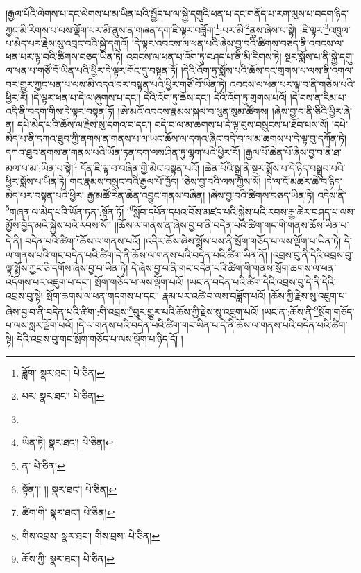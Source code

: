 །རྒྱལ་པོའི་ལེགས་པ་དང་ལེགས་པ་མ་ཡིན་པའི་སྤྱོད་པ་ལ་སྐྱེ་དགུའི་ཕན་པ་དང་གནོད་པ་རག་ལུས་པ་བདག་ཉིད་ཀྱང་མི་རིགས་པ་ལས་ལྡོག་པར་མི་ནུས་ན་གཞན་དག་ཇི་ལྟར་བཟློག་\footnote{ཟློག་  སྣར་ཐང་།  པེ་ཅིན། }:པར་མི་\footnote{པར་  སྣར་ཐང་།  པེ་ཅིན། }ནུས་ཞེས་པ་སྟེ། :ཇི་ལྟར་\footnote{}འཁྲུལ་པ་མེད་པར་རྗེས་སུ་འབྲང་བའི་སྐྱེ་དགུའོ། །དེ་ལྟར་འབངས་ལ་ཕན་པའི་ཞེས་བྱ་བའི་ཚིགས་བཅད་ནི་འབངས་ལ་ཕན་པར་ལྟ་བའི་ཚིགས་བཅད་ཡིན་ཏེ། འབངས་ལ་ཕན་པ་འོག་ཏུ་བཤད་པ་ནི་མི་རིགས་ཏེ། སྔར་སྨོས་པ་ནི་སྐྱེ་དགུ་ལ་ཕན་པ་གཙོ་བོ་ཡིན་པའི་ཕྱིར་དེ་ལྟར་གོང་དུ་བསྟན་ཏོ། །དེའི་འོག་ཏུ་སྨོས་པའི་ཆོས་དང་གྲགས་པ་ལས་ནི་འགལ་བར་གྱུར་ཀྱང་ཕན་པ་ལས་མི་འདའ་བར་བསྟན་པའི་ཕྱིར་གཙོ་བོ་ཡིན་ཏེ། འབངས་ལ་ཕན་པར་ལྟ་བ་ནི་གཅེས་པའི་ཕྱིར་རོ། །དེ་ལྟར་ཕན་པ་དེ་ལ་ཞུགས་པ་དང་། དེའི་འོག་ཏུ་ཆོས་དང་། དེའི་འོག་ཏུ་གྲགས་པའོ། །དེ་བས་ན་རིམ་པ་འདི་ནི་བདག་གིས་དེ་ལྟར་བསྟན་ཏོ། །ཨེ་མའོ་འབངས་རྣམས་སྐལ་བ་ཕུན་སུམ་ཚོགས། །ཞེས་བྱ་བ་ནི་ཅིའི་ཕྱིར་ཞེ་ན། དཔེ་མེད་པའི་ཆོས་ལ་རྗེས་སུ་དགའ་བ་དང་། བདེ་བ་ལ་མ་ཆགས་པ་དེ་ལྟ་བུས་བསྲུངས་པ་ཐོབ་པས་སོ། །དཔེ་མེད་པ་ནི་དཀའ་ཐུབ་ཀྱི་ནགས་ན་གནས་པ་ལ་ཡང་ཆོས་ལ་དགའ་ཞིང་བདེ་བ་ལ་མ་ཆགས་པ་དེ་ལྟ་བུ་དཀོན་ཏེ། དཀའ་ཐུབ་ནགས་ན་གནས་པའི་ཡོན་ཏན་དག་ལས་ཤིན་ཏུ་ལྷག་པའི་ཕྱིར་རོ། །རྒྱལ་པོ་ཆེན་པོ་ཞེས་བྱ་བ་ནི་ཐ་མལ་པ་མ་:ཡིན་པ་སྟེ།\footnote{ཡིན་ཏེ།  སྣར་ཐང་།  པེ་ཅིན། } དོན་ཇི་ལྟ་བ་བཞིན་གྱི་མིང་བསྟན་པའོ། །ཆེན་པོའི་སྒྲ་ནི་སྔར་སྨོས་པ་དེ་ཉིད་བསྒྲུབ་པའི་ཕྱིར་སྨོས་པ་ཡིན་ཏེ། གང་རྣམས་བསྲུང་བའི་རྒྱལ་པོ་ཁྱོད། །ཅེས་བྱ་བའི་ལས་ཀྱིས་སོ། །དེ་ལ་ངོ་མཚར་ཆེ་བ་ཉིད་མེད་པར་བསྟན་པའི་ཕྱིར། རྒྱ་མཚོ་རིན་ཆེན་འབྱུང་གནས་བཞིན། །ཞེས་བྱ་བའི་ཚིགས་བཅད་ཡིན་ཏེ། འདིས་ནི་\footnote{ན་  པེ་ཅིན། }གཞན་ལ་མེད་པའི་ཡོན་ཏན་:སྟོན་ཏོ། །\footnote{སྟོན་།། །།  སྣར་ཐང་།  པེ་ཅིན། }སློབ་དཔོན་དཔའ་བོས་མཛད་པའི་སྐྱེས་པའི་རབས་རྒྱ་ཆེར་བཤད་པ་ལས་མྱོས་བྱེད་མའི་སྐྱེས་པའི་རབས་སོ།། །།ཆོས་ལ་གནས་ན་ཞེས་བྱ་བ་ནི་བདེན་པའི་ཚིག་གང་གི་གནས་ཆོས་ཡིན་པ་དེ་ནི། བདེན་པའི་ཚིག་\footnote{ཚིག་གི་  སྣར་ཐང་།  པེ་ཅིན། }ཆོས་ལ་གནས་པའོ། །འདིར་ཆོས་ཞེས་སྨོས་པས་ནི་སྲོག་གཅོད་པ་ལས་ལྡོག་པ་ཡིན་ཏེ། དེ་ལ་གནས་པའི་གང་བདེན་པའི་ཚིག་དེ་ནི་ཆོས་ལ་གནས་པའི་བདེན་པའི་ཚིག་ཡིན་ནོ། །འབྲས་བུ་ནི་དེའི་འབྲས་བུ་ལྟ་སྨོས་ཀྱང་ཅི་དགོས་ཞེས་བྱ་བ་ཡིན་ཏེ། དེ་ཞེས་བྱ་བ་ནི་གང་བདེན་པའི་ཚིག་གི་གནས་སྲོག་ཆགས་ལ་ཕན་འདོགས་པར་འཇུག་པ་དང་། སྲོག་གཅོད་པ་ལས་ལྡོག་པའོ། །ཡང་ན་བདེན་པའི་ཚིག་དེའི་འབྲས་བུ་དེ་ནི་དེའི་འབྲས་བུ་སྟེ། སྲོག་ཆགས་ལ་ཕན་གདགས་པ་དང་། རྣམ་པར་འཚེ་བ་ལས་བཟློག་པའོ། །ཆོས་ཀྱི་རྗེས་སུ་འཇུག་པ་ཞེས་བྱ་བ་ནི་བདེན་པའི་ཚིག་:གི་འབྲས་\footnote{གིས་འབྲས་  སྣར་ཐང་། གིས་བྲས་  པེ་ཅིན། }བུར་གྱུར་པའི་ཆོས་ཀྱི་རྗེས་སུ་འཇུག་པའོ། །ཡང་ན་:ཆོས་ནི་\footnote{ཆོས་ཀྱི་  སྣར་ཐང་།  པེ་ཅིན། }སྲོག་གཅོད་པ་ལས་སླར་ལྡོག་པའོ། །དེ་ལ་གནས་པའི་བདེན་པའི་ཚིག་གང་ཡིན་པ་དེ་ནི་ཆོས་ལ་གནས་པའི་བདེན་པའི་ཚིག་སྟེ། དེའི་འབྲས་བུ་གང་སྲོག་གཅོད་པ་ལས་ལྡོག་པ་ཉིད་དོ། །
